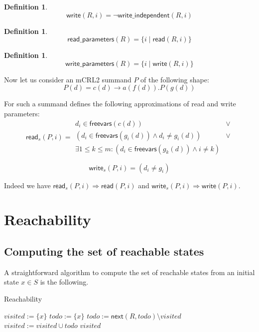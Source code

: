 \documentclass{article}
\newtheorem{definition}[theorem]{Definition}
\newcommand{\var}[1]{\ensuremath{\textit{#1}}}
\begin{document}
\begin{definition}
\[
\textsf{write}(R, i) = \neg \textsf{write\_independent}(R, i)
\]
\end{definition}

\begin{definition}
\[
\textsf{read\_parameters}(R) = \{ i \mid \textsf{read}(R, i) \}
\]
\end{definition}

\begin{definition}
\[
\textsf{write\_parameters}(R) = \{ i \mid \textsf{write}(R, i) \}
\]
\end{definition}

\vspace{0.5cm}
\noindent
Now let us consider an mCRL2 summand $P$ of the following shape:
\[
P(d) = c(d) \rightarrow a(f(d)) . P(g(d))
\]

\noindent
For such a summand \cite{DBLP:conf/hvc/MeijerKBP14} defines the following approximations of read and write parameters:
\[
\textsf{read}_s(P, i) =
\begin{array}{ll}
d_i \in \textsf{freevars}(c(d)) & \lor \\
(d_i \in \textsf{freevars}(g_i(d)) \land d_i \neq g_i(d)) & \lor \\   
\exists 1 \leq k \leq m: (d_i \in \textsf{freevars}(g_k(d)) \land i \neq k)   
\end{array}
\]

\[
\textsf{write}_s(P, i) = (d_i \neq g_i)
\]

\vspace{0.5cm}
\noindent
Indeed we have $\textsf{read}_s(P, i) \Rightarrow \textsf{read}(P, i)$ and
$\textsf{write}_s(P, i) \Rightarrow \textsf{write}(P, i)$.

\newpage
\newpage
\section{Reachability}

\subsection{Computing the set of reachable states}
A straightforward algorithm to compute the set of reachable states from an initial state
$x \in S$ is the following.

\begin{algorithm}[ht]
\caption{Reachability}
\label{alg:reachability}
\begin{algorithmic}[1]
\State $\var{visited} := \{ x \}$
\State $\var{todo} := \{ x \}$
\While {$\var{todo} \neq \emptyset$}
    \State $\var{todo} := \textsf{next}(R, \var{todo}) \setminus \var{visited}$
    \State $\var{visited} := \var{visited} \cup \var{todo}$
\EndWhile
\State \Return \var{visited}
\EndFunction
\end{algorithmic}
\end{algorithm}
\end{document}
